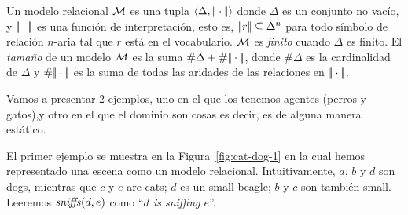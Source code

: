 Un modelo relacional $\mathcal{M}$ es una tupla 
$\langle \Delta,|\!|\cdot|\!| \rangle$ donde $\Delta$ es un conjunto no vac\'io, y
$|\!|\cdot|\!|$ es una funci\'on de interpretaci\'on, esto es,
$|\!|r|\!| \subseteq \Delta^n$ para todo s\'imbolo de relaci\'on $n$-aria tal que
$r$ est\'a en el vocabulario. $\mathcal{M}$ es \emph{finito} cuando
$\Delta$ es finito.  El \emph{tama\~no} de un modelo $\mathcal{M}$ es la suma
$\#\Delta + \#|\!|\cdot|\!|$, donde $\#\Delta$ es la cardinalidad
de $\Delta$ y $\#|\!|\cdot|\!|$ es la suma de todas las aridades de las
relaciones en $|\!|\cdot|\!|$.

Vamos a presentar 2 ejemplos, uno en el que los tenemos agentes (perros y gatos),y otro en el que el dominio son cosas es decir, es de alguna manera est\'atico.

El primer ejemplo se muestra en la Figura~\ref{fig:cat-dog-1} en la cual hemos representado una escena
como un modelo relacional. Intuitivamente, $a$, $b$ y $d$ son dogs, mientras que 
$c$ y $e$ are cats;  $d$ es un small beagle;
 $b$ y $c$ son tambi\'en small.
 Leeremos $\mathit{sniffs}(d,e)$ como ``{\em $d$ is sniffing $e$}''.\\

